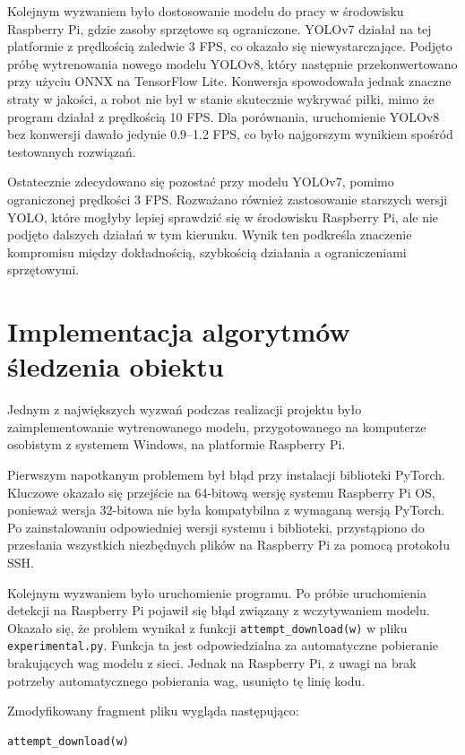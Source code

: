 \documentclass[a4paper,twoside,12pt]{book}
\begin{document}
Kolejnym wyzwaniem było dostosowanie modelu do pracy w środowisku Raspberry Pi, gdzie zasoby sprzętowe są ograniczone. YOLOv7 działał na tej platformie z prędkością zaledwie 3 FPS, co okazało się niewystarczające. Podjęto próbę wytrenowania nowego modelu YOLOv8, który następnie przekonwertowano przy użyciu ONNX na TensorFlow Lite. Konwersja spowodowała jednak znaczne straty w jakości, a robot nie był w stanie skutecznie wykrywać piłki, mimo że program działał z prędkością 10 FPS. Dla porównania, uruchomienie YOLOv8 bez konwersji dawało jedynie 0.9–1.2 FPS, co było najgorszym wynikiem spośród testowanych rozwiązań.

Ostatecznie zdecydowano się pozostać przy modelu YOLOv7, pomimo ograniczonej prędkości 3 FPS. Rozważano również zastosowanie starszych wersji YOLO, które mogłyby lepiej sprawdzić się w środowisku Raspberry Pi, ale nie podjęto dalszych działań w tym kierunku. Wynik ten podkreśla znaczenie kompromisu między dokładnością, szybkością działania a ograniczeniami sprzętowymi. 

\section{Implementacja algorytmów śledzenia obiektu}

Jednym z największych wyzwań podczas realizacji projektu było zaimplementowanie wytrenowanego modelu, przygotowanego na komputerze osobistym z systemem Windows, na platformie Raspberry Pi. 

Pierwszym napotkanym problemem był błąd przy instalacji biblioteki PyTorch. Kluczowe okazało się przejście na 64-bitową wersję systemu Raspberry Pi OS, ponieważ wersja 32-bitowa nie była kompatybilna z wymaganą wersją PyTorch. Po zainstalowaniu odpowiedniej wersji systemu i biblioteki, przystąpiono do przesłania wszystkich niezbędnych plików na Raspberry Pi za pomocą protokołu SSH.

Kolejnym wyzwaniem było uruchomienie programu. Po próbie uruchomienia detekcji na Raspberry Pi pojawił się błąd związany z wczytywaniem modelu. Okazało się, że problem wynikał z funkcji \texttt{attempt\_download(w)} w pliku \texttt{experimental.py}. Funkcja ta jest odpowiedzialna za automatyczne pobieranie brakujących wag modelu z sieci. Jednak na Raspberry Pi, z uwagi na brak potrzeby automatycznego pobierania wag, usunięto tę linię kodu.

Zmodyfikowany fragment pliku wygląda następująco:
\begin{lstlisting}[language=Python, caption={Usunięcie funkcji \texttt{attempt\_download} z pliku \texttt{experimental.py}.}, label={lst:attempt_download_removal}, captionpos=b]
 attempt_download(w)
\end{lstlisting}
\end{document}
